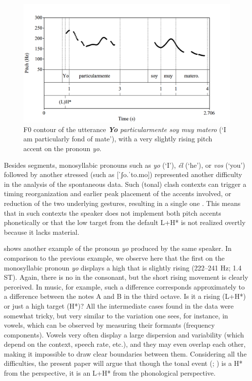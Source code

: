 \documentclass[output=paper]{langsci/langscibook}
\begin{document}
  \begin{figure}[p]
\includegraphics[width=\textwidth]{figures/pes-img6.png}
\caption{F0 contour of the utterance \textit{\textbf{Yo} particularmente soy muy matero} (‘I am particularly fond of {mate}’), with a very slightly rising pitch accent on the pronoun \textit{yo}.\label{fig:pes:6}}
\end{figure}
  
Besides  segments, monosyllabic pronouns such as \textit{yo} (‘I’), \textit{él} (‘he’), or \textit{vos} (‘you’) followed by another stressed  (such as [ˈʃo.ˈto.mo]) represented another difficulty in the analysis of the spontaneous data. Such (tonal) clash contexts can trigger a timing reorganization and earlier peak placement of the accents involved, or reduction of the two underlying gestures, resulting in a single one \citep{Prieto1995}. This means that in such contexts the speaker does not implement both pitch accents phonetically or that the low target from the default L+H* is not realized overtly because it lacks  material.





 shows another example of the pronoun \textit{yo} produced by the same speaker. In comparison to the previous example, we observe here that the first  on the monosyllabic pronoun \textit{yo} displays a high  that is slightly rising (222–241 Hz; 1.4 ST). Again, there is no  in the  consonant, but the short rising movement is clearly perceived. In music, for example, such a difference corresponds approximately to a difference between the notes A and B in the third octave. Is it a rising (L+H*) or just a high target (H*)? All the intermediate cases found in the data were somewhat tricky, but very similar to the variation one sees, for instance, in vowels, which can be observed by measuring their formants (frequency components). Vowels very often display a large dispersion and variability (which depend on the context, speech rate, etc.), and they may even overlap each other, making it impossible to draw clear boundaries between them. Considering all the difficulties, the present paper will argue that though the tonal event (; ) is a H* from the  perspective, it is an L+H* from the phonological perspective.
\end{document}
